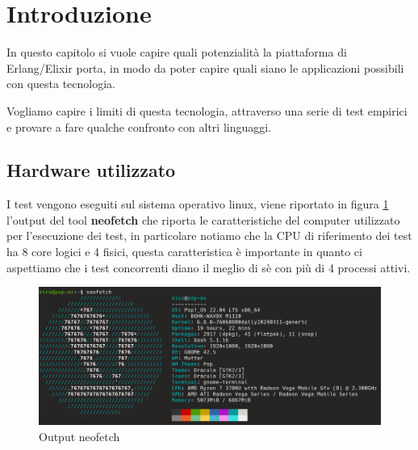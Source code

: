 \section{Introduzione}
In questo capitolo si vuole capire quali potenzialità
la piattaforma di Erlang/Elixir porta, in modo da poter
capire quali siano le applicazioni possibili con questa tecnologia.

Vogliamo capire i limiti di questa tecnologia, attraverso una serie
di test empirici e provare a fare qualche confronto con altri
linguaggi.

\subsection{Hardware utilizzato}

I test vengono eseguiti sul sistema operativo linux, viene riportato in
figura \ref{fig:neofetch} l'output del tool \textbf{neofetch} che riporta
le caratteristiche del computer utilizzato per l'esecuzione dei test,
in particolare notiamo che la CPU di riferimento dei test
ha 8 core logici e 4 fisici, questa caratteristica è importante
in quanto ci aspettiamo che i test concorrenti diano il meglio di
sè con più di 4 processi attivi.

\begin{figure}[!htp]
    \centering
    \includegraphics[keepaspectratio=true,scale=0.3]{images/neofetch.png}
	\caption{Output neofetch}
  	\label{fig:neofetch}
\end{figure}



